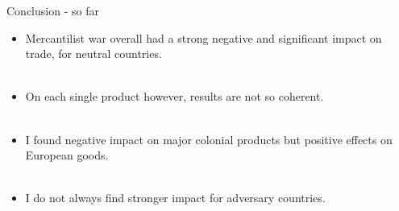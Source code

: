 \documentclass[11pt]{beamer}
\begin{document}
\begin{frame}{Conclusion - so far}
\begin{itemize}
\item{Mercantilist war overall had a strong negative and significant impact on trade, for neutral countries.}\\~\\
\item{On each single product however, results are not so coherent.}\\~\\
\item{I found negative impact on major colonial products but positive effects on European goods.}\\~\\
\item{I do not always find stronger impact for adversary countries.}

\end{itemize}
\end{frame}
\end{document}
